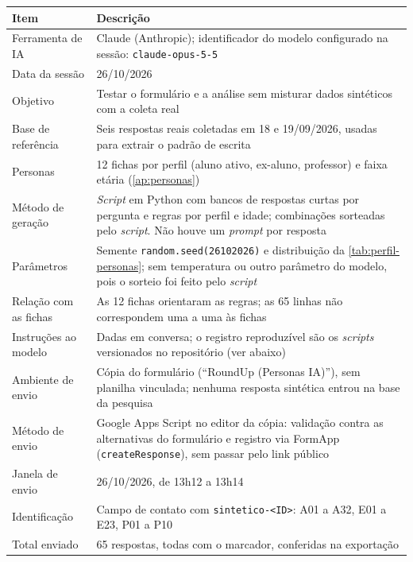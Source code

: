 \begin{apendicesenv}
\begin{quadro}[!htb]
  \caption{Protocolo de geração e envio das respostas sintéticas}
  \label{qua:protocolo}
  \centering
  \footnotesize
  \begin{tabular}{|p{3.4cm}|p{9.8cm}|}
    \hline
    \textbf{Item} & \textbf{Descrição} \\ \hline
    Ferramenta de IA & Claude (Anthropic); identificador do modelo configurado na sessão: \texttt{claude-opus-5-5} \\ \hline
    Data da sessão & 26/10/2026 \\ \hline
    Objetivo & Testar o formulário e a análise sem misturar dados sintéticos com a coleta real \\ \hline
    Base de referência & Seis respostas reais coletadas em 18 e 19/09/2026, usadas para extrair o padrão de escrita \\ \hline
    Personas & 12 fichas por perfil (aluno ativo, ex-aluno, professor) e faixa etária (\autoref{ap:personas}) \\ \hline
    Método de geração & \textit{Script} em Python com bancos de respostas curtas por pergunta e regras por perfil e idade; combinações sorteadas pelo \textit{script}. Não houve um \textit{prompt} por resposta \\ \hline
    Parâmetros & Semente \texttt{random.seed(26102026)} e distribuição da \autoref{tab:perfil-personas}; sem temperatura ou outro parâmetro do modelo, pois o sorteio foi feito pelo \textit{script} \\ \hline
    Relação com as fichas & As 12 fichas orientaram as regras; as 65 linhas não correspondem uma a uma às fichas \\ \hline
    Instruções ao modelo & Dadas em conversa; o registro reproduzível são os \textit{scripts} versionados no repositório (ver abaixo) \\ \hline
    Ambiente de envio & Cópia do formulário (``RoundUp (Personas IA)''), sem planilha vinculada; nenhuma resposta sintética entrou na base da pesquisa \\ \hline
    Método de envio & Google Apps Script no editor da cópia: validação contra as alternativas do formulário e registro via FormApp (\texttt{createResponse}), sem passar pelo link público \\ \hline
    Janela de envio & 26/10/2026, de 13h12 a 13h14 \\ \hline
    Identificação & Campo de contato com \texttt{sintetico-<ID>}: A01 a A32, E01 a E23, P01 a P10 \\ \hline
    Total enviado & 65 respostas, todas com o marcador, conferidas na exportação \\ \hline
  \end{tabular}
\end{quadro}


\end{apendicesenv}
